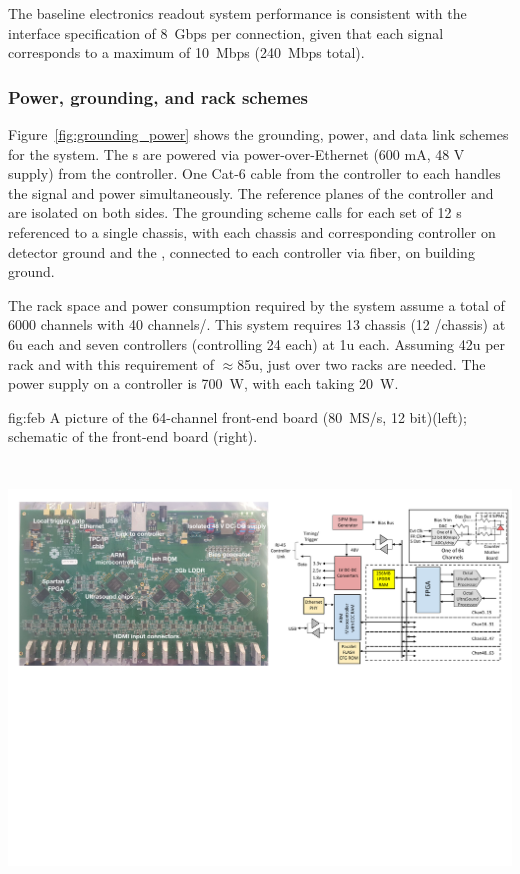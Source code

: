 The baseline electronics readout system performance is consistent with the  interface specification of 8~Gbps per connection, given that  
each  signal corresponds to a maximum of 10~Mbps (240~Mbps total).  

\subsubsection{Power, grounding, and rack schemes} 

Figure~\ref{fig:grounding_power} shows the grounding, power, and data link schemes for the system. The s are powered via power-over-Ethernet (600 mA, 48 V supply) from the controller. One Cat-6 cable from the controller to each  handles the signal and power simultaneously. The reference planes of the controller and  are isolated on both sides. The grounding scheme calls for each set of 12 s referenced to a single chassis, with each chassis and corresponding controller on detector ground and the , connected to each controller via fiber, on building ground. 
 
The rack space and power consumption required by the system assume
a total of 6000 channels with 40 channels/. This system requires 13 chassis (12 /chassis) at 6u each and seven controllers (controlling 24  each) at 1u each. Assuming 42u per rack and with this requirement of $\approx$85u, just over  two racks are needed. The power supply on a controller is 700~W, with each  taking 20~W. 
 

\begin{dunefigure}
 {fig:feb}
 {A picture of the 64-channel  front-end board (80~MS/s, 12 bit)(left); schematic of the front-end board (right).}
\includegraphics[height=4.8in]{graphics/pds-feb-tdr.pdf} 
\vspace{-6.3cm}
\end{dunefigure}

